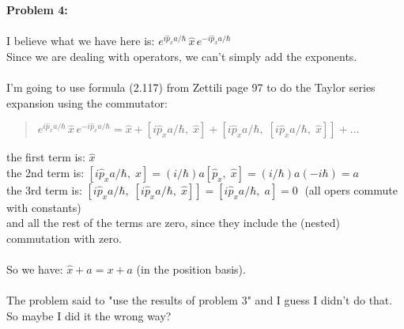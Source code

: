 \documentclass{article}
\begin{document}
\pagebreak
{\bf Problem 4:}
\\\\
I believe what we have here is: 
$e^{i\hat{p}_xa/\hbar}\,\hat{x}\,e^{-i\hat{p}_xa/\hbar}$\\
Since we are dealing with operators, we can't simply add the exponents.
\\\\
I'm going to use formula (2.117) from Zettili page 97 to do the Taylor
series expansion using the commutator:
\begin{quote}
$
    e^{i\hat{p}_xa/\hbar}\,\hat{x}\,e^{-i\hat{p}_xa/\hbar}
    = \hat{x} +\left[i\hat{p}_xa/\hbar,\;\hat{x}\right]
    + \left[i\hat{p}_xa/\hbar,\;\left[i\hat{p}_xa/\hbar,\;\hat{x}\right]\right]
    + ...
$
\end{quote}
the first term is: $\hat{x}$
\vspace{6pt}\\
the 2nd term is: $\left[i\hat{p}_xa/\hbar,\;\hat{x}\right]
    = (i/\hbar)a\left[\hat{p}_x,\;\hat{x}\right]
    = (i/\hbar)a(-i\hbar) = a
$
\vspace{6pt}\\
the 3rd term is:
 $\left[i\hat{p}_xa/\hbar,\;\left[i\hat{p}_xa/\hbar,\;\hat{x}\right]\right]
    = \left[i\hat{p}_xa/\hbar,\;a\right]=0\;$ (all opers commute with
    constants)
\vspace{6pt}\\
and all the rest of the terms are zero, since they include the (nested)
commutation with zero.\\\\
So we have: $\hat{x}+a = x+a$ (in the position basis).
\\\\
The problem said to "use the results of problem 3" and I guess I didn't
do that. So maybe I did it the wrong way?
\end{document}
